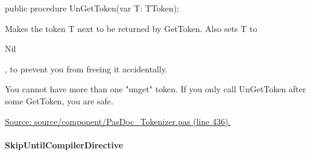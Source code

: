 \documentclass{report}
\newif\ifpdf
\begin{document}
\label{PasDoc_Tokenizer.TTokenizer-UnGetToken}
\begin{list}{}{
\setlength{\itemindent}{0cm}
\setlength{\listparindent}{0cm}
\setlength{\leftmargin}{\evensidemargin}
\addtolength{\leftmargin}{\tmplength}
\settowidth{\labelsep}{X}
\addtolength{\leftmargin}{\labelsep}
\setlength{\labelwidth}{\tmplength}
}
\item[\textbf{Declaration}\hfill]
\ifpdf
\begin{flushleft}
\fi
\begin{ttfamily}
public procedure UnGetToken(var T: TToken);\end{ttfamily}

\ifpdf
\end{flushleft}
\fi

\par
\item[\textbf{Description}]
Makes the token T next to be returned by GetToken. Also sets T to \begin{ttfamily}Nil\end{ttfamily}, to prevent you from freeing it accidentally.

You cannot have more than one "unget" token. If you only call UnGetToken after some GetToken, you are safe.\par
\href{https://github.com/pasdoc/pasdoc/blob/master/source/component/PasDoc_Tokenizer.pas#L436}{Source: source/component/PasDoc{\_}Tokenizer.pas (line 436).}

\end{list}
\paragraph*{SkipUntilCompilerDirective}\hspace*{\fill}
\end{document}
